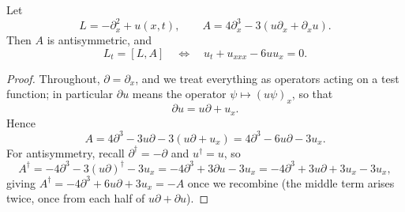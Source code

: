 \documentclass[a4paper]{scrartcl}
\begin{document}
\begin{proposition}
	Let
	$$
	L = -\partial_x^2 + u(x,t), \qquad A = 4\partial_x^3 - 3\left(u\partial_x + \partial_x u\right).
	$$
	Then $A$ is antisymmetric, and
	$$
	L_t = [L,A] \quad\Longleftrightarrow\quad u_t + u_{xxx} - 6uu_x = 0.
	$$
\end{proposition}
\begin{proof}
	Throughout, $\partial = \partial_x$, and we treat everything as operators acting on a test function; in particular $\partial u$ means the operator $\psi\mapsto (u\psi)_x$, so that
	$$
	\partial u = u\partial + u_x.
	$$
	Hence
	$$
	A = 4\partial^3 - 3u\partial - 3\left(u\partial + u_x\right) = 4\partial^3 - 6u\partial - 3u_x.
	$$
	For antisymmetry, recall $\partial^\dagger = -\partial$ and $u^\dagger = u$, so
	$$
	A^\dagger = -4\partial^3 - 3\left(u\partial\right)^\dagger - 3u_x = -4\partial^3 + 3\partial u - 3u_x = -4\partial^3 + 3u\partial + 3u_x - 3u_x,
	$$
	giving $A^\dagger = -4\partial^3 + 6u\partial + 3u_x = -A$ once we recombine (the middle term arises twice, once from each half of $u\partial + \partial u$).


\end{proof}
\end{document}
